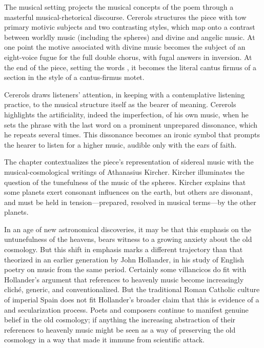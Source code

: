 \documentclass{vcbook-proposal}
\begin{document}
The musical setting projects the musical concepts of the poem through a 
masterful musical-rhetorical discourse.
Cererols structures the piece with tow primary motivic subjects and two 
contrasting styles, which map onto a contrast between worldly music (including 
the spheres) and divine and angelic music. 
At one point the motive associated with divine music becomes the subject of an 
eight-voice fugue for the full double chorus, with fugal answers in inversion.
At the end of the piece, setting the words , it becomes the literal cantus firmus of a section in the style of a 
cantus-firmus motet.

Cererols draws listeners' attention, in keeping with a contemplative listening 
practice, to the musical structure itself as the bearer of meaning.
Cererols highlights the artificiality, indeed the imperfection, of his own 
music, when he sets the phrase  with 
the last word on a prominent unprepared dissonance, which he repeats several 
times.
This dissonance becomes an ironic symbol that prompts the hearer to listen for 
a higher music, audible only with the ears of faith.

The chapter contextualizes the piece's representation of sidereal music with 
the musical-cosmological writings of Athanasius Kircher.
Kircher illuminates the question of the tunefulness of the music of the spheres.
Kircher explains that some planets exert consonant influences on the earth, but 
others are dissonant, and must be held in tension---prepared, resolved in 
musical terms---by the other planets. 

In an age of new astronomical discoveries, it may be that this emphasis on the 
untunefulness of the heavens, bears witness to a growing anxiety about the old 
cosmology.
But this shift in emphasis marks a different trajectory than that theorized in 
an earlier generation by John Hollander, in his study of English poetry on 
music from the same period.%
  \autocite{Hollander:Untuning}
Certainly some villancicos do fit with Hollander's argument that references to 
heavenly music become increasingly cliché, generic, and conventionalized.
But the traditional Roman Catholic culture of imperial Spain does not fit 
Hollander's broader claim that this is evidence of a  
and secularization process.
Poets and composers continue to manifest genuine belief in the old cosmology; 
if anything the increasing abstraction of their references to heavenly music 
might be seen as a way of preserving the old cosmology in a way that made it 
immune from scientific attack.
\end{document}
